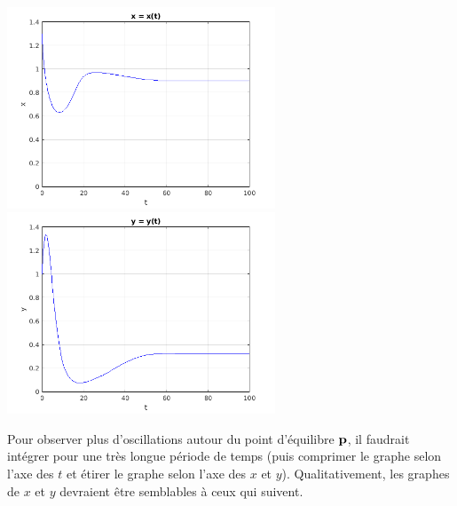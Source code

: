 {\includegraphics[width=8cm]{18_syst_equ_diff/graphe5a}
\includegraphics[width=8cm]{18_syst_equ_diff/graphe5b}

Pour observer plus d'oscillations autour du point d'équilibre
$\mathbf{p}$, il faudrait intégrer pour une très longue période de
temps (puis comprimer le graphe selon l'axe des $t$ et
étirer le graphe selon l'axe des $x$ et $y$).
Qualitativement, les graphes de $x$ et $y$ devraient être semblables à
ceux qui suivent.
}

